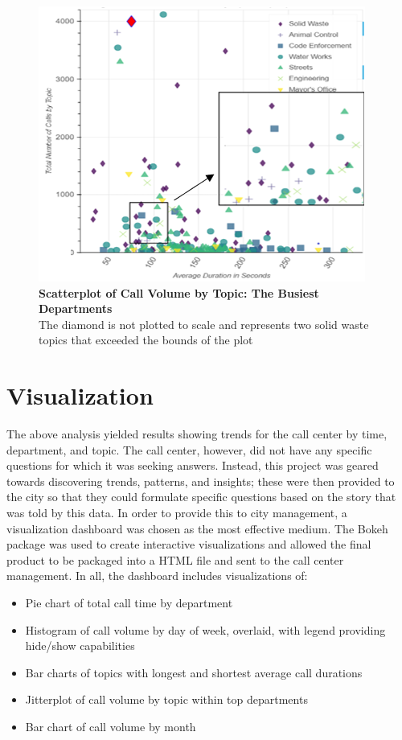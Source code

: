 \documentclass[12pt]{article}
\begin{document}
	\begin{figure}
	\includegraphics[scale=.6]{scatter_ready.png}
	\caption{\textbf{Scatterplot of Call Volume by Topic: The Busiest Departments} \\
		The diamond is not plotted to scale and represents two solid waste topics that exceeded the bounds of the plot}
	\end{figure}






\section{Visualization}


The above analysis yielded results showing trends for the call center by time, department, and topic.  The call center, however, did not have any specific questions for which it was seeking answers.  Instead, this project was geared towards discovering trends, patterns, and insights; these were then provided to the city so that they could formulate specific questions based on the story that was told by this data.  In order to provide this to city management, a visualization dashboard was chosen as the most effective medium.  The Bokeh package was used to create interactive visualizations and allowed the final product to be packaged into a HTML file and sent to the call center management.  In all, the dashboard includes visualizations of:

	\begin{itemize}
		\item Pie chart of total call time by department
		\item Histogram of call volume by day of week, overlaid, with legend providing hide/show capabilities
		\item Bar charts of topics with longest and shortest average call durations
		\item Jitterplot of call volume by topic within top departments
		\item Bar chart of call volume by month
	\end{itemize}
\end{document}
